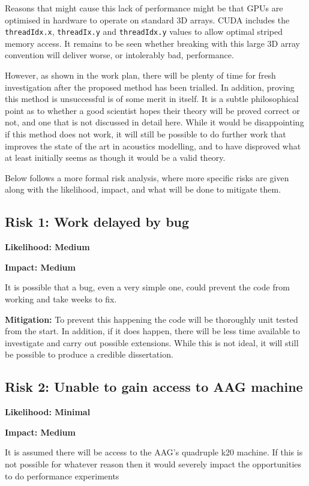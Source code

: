 \documentclass[a4paper,12pt]{article}
\begin{document}
Reasons that might cause this lack of performance might be that GPUs are optimised in hardware to operate on standard 3D arrays. CUDA includes the \verb|threadIdx.x|, \verb|threadIx.y| and \verb|threadIdx.y| values to allow optimal striped memory access. It remains to be seen whether breaking with this large 3D array convention will deliver worse, or intolerably bad, performance.

However, as shown in the work plan, there will be plenty of time for fresh investigation after the proposed method has been trialled. In addition, proving this method is unsuccessful is of some merit in itself. It is a subtle philosophical point as to whether a good scientist hopes their theory will be proved correct or not, and one that is not discussed in detail here. While it would be disappointing if this method does not work, it will still be possible to do further work that improves the state of the art in acoustics modelling, and to have disproved what at least initially seems as though it would be a valid theory.

Below follows a more formal risk analysis, where more specific risks are given along with the likelihood, impact, and what will be done to mitigate them.

\subsection{Risk 1: Work delayed by bug}
\textbf{Likelihood: Medium} 

\textbf{Impact: Medium} 

It is possible that a bug, even a very simple one, could prevent the code from working and take weeks to fix.

\textbf{Mitigation:} To prevent this happening the code will be thoroughly unit tested from the start. In addition, if it does happen, there will be less time available to investigate and carry out possible extensions. While this is not ideal, it will still be possible to produce a credible dissertation.

\subsection{Risk 2: Unable to gain access to AAG machine}
\textbf{Likelihood: Minimal}

\textbf{Impact: Medium}

It is assumed there will be access to the AAG's quadruple k20 machine. If this is not possible for whatever reason then it would severely impact the opportunities to do performance experiments
\end{document}
